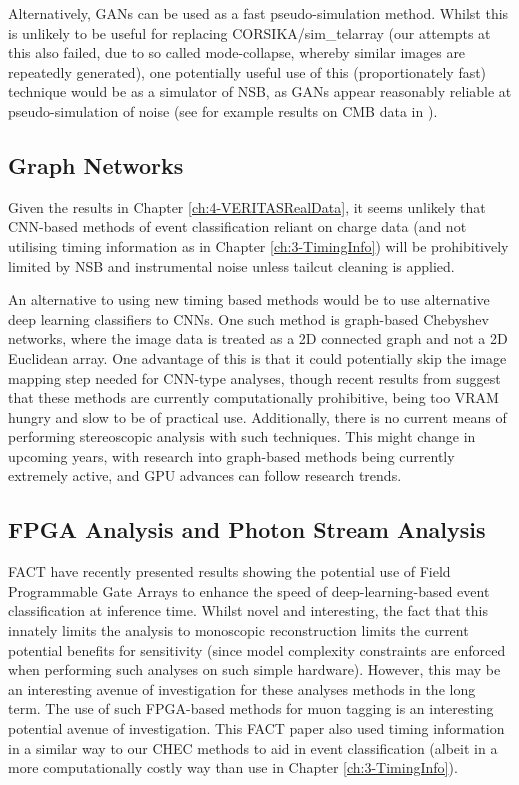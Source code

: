Alternatively, GANs can be used as a fast pseudo-simulation method. Whilst this is unlikely to be useful for replacing CORSIKA/sim\_telarray (our attempts at this also failed, due to so called mode-collapse, whereby similar images are repeatedly generated), one potentially useful use of this (proportionately fast) technique would be as a simulator of NSB, as GANs appear reasonably reliable at pseudo-simulation of noise (see for example results on CMB data in \cite{darshgan}). 

\subsection{Graph Networks}
Given the results in Chapter \ref{ch:4-VERITASRealData}, it seems unlikely that CNN-based methods of event classification reliant on charge data (and not utilising timing information as in Chapter \ref{ch:3-TimingInfo}) will be prohibitively limited by NSB and instrumental noise unless tailcut cleaning is applied.

An alternative to using new timing based methods would be to use alternative deep learning classifiers to CNNs. One such method is graph-based Chebyshev networks, where the image data is treated as a 2D connected graph and not a 2D Euclidean array. One advantage of this is that it could potentially skip the image mapping step needed for CNN-type analyses, though recent results from \cite{adithesis} suggest that these methods are currently computationally prohibitive, being too VRAM hungry and slow to be of practical use. Additionally, there is no current means of performing stereoscopic analysis with such techniques. This might change in upcoming years, with research into graph-based methods being currently extremely active, and GPU advances can follow research trends.

\subsection{FPGA Analysis and Photon Stream Analysis}

FACT have recently presented results showing the potential use of Field Programmable Gate Arrays to enhance the speed of deep-learning-based event classification at inference time. Whilst novel and interesting, the fact that this innately limits the analysis to monoscopic reconstruction limits the current potential benefits for sensitivity (since model complexity constraints are enforced when performing such analyses on such simple hardware). However, this may be an interesting avenue of investigation for these analyses methods in the long term. The use of such FPGA-based methods for muon tagging is an interesting potential avenue of investigation. This FACT paper also used timing information in a similar way to our CHEC methods to aid in event classification (albeit in a more computationally costly way than use in Chapter \ref{ch:3-TimingInfo}).


